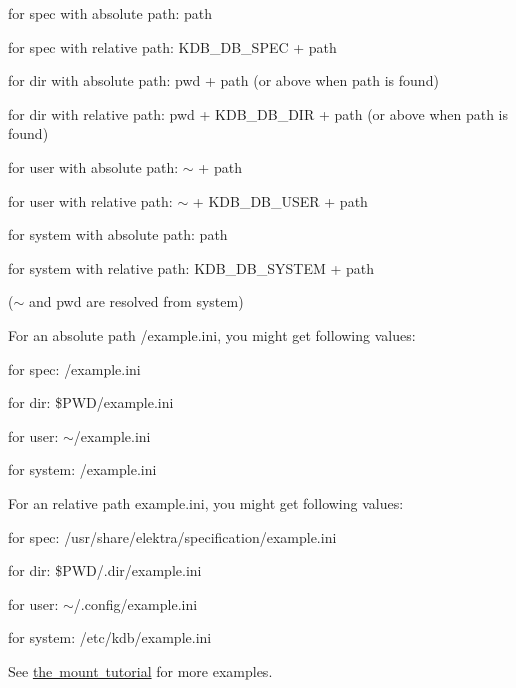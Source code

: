 \begin{DoxyItemize}
\item for spec with absolute path\+: path
\item for spec with relative path\+: {\ttfamily K\+D\+B\+\_\+\+D\+B\+\_\+\+S\+P\+EC} + path
\item for dir with absolute path\+: {\ttfamily pwd} + path (or above when path is found)
\item for dir with relative path\+: {\ttfamily pwd} + {\ttfamily K\+D\+B\+\_\+\+D\+B\+\_\+\+D\+IR} + path (or above when path is found)
\item for user with absolute path\+: {\ttfamily $\sim$} + path
\item for user with relative path\+: {\ttfamily $\sim$} + {\ttfamily K\+D\+B\+\_\+\+D\+B\+\_\+\+U\+S\+ER} + path
\item for system with absolute path\+: path
\item for system with relative path\+: {\ttfamily K\+D\+B\+\_\+\+D\+B\+\_\+\+S\+Y\+S\+T\+EM} + path
\end{DoxyItemize}

($\sim$ and {\ttfamily pwd} are resolved from system)

For an absolute path {\ttfamily /example.ini}, you might get following values\+:


\begin{DoxyItemize}
\item for spec\+: {\ttfamily /example.ini}
\item for dir\+: {\ttfamily \$\+P\+WD/example.ini}
\item for user\+: {\ttfamily $\sim$/example.ini}
\item for system\+: {\ttfamily /example.ini}
\end{DoxyItemize}

For an relative path example.\+ini, you might get following values\+:


\begin{DoxyItemize}
\item for spec\+: {\ttfamily /usr/share/elektra/specification/example.ini}
\item for dir\+: {\ttfamily \$\+P\+WD/.dir/example.\+ini}
\item for user\+: {\ttfamily $\sim$/.config/example.\+ini}
\item for system\+: {\ttfamily /etc/kdb/example.ini}
\end{DoxyItemize}

See \mbox{\hyperlink{doc_tutorials_mount_md}{the mount tutorial}} for more examples.

